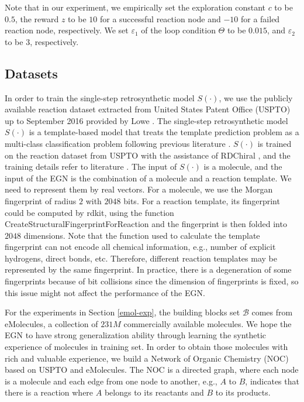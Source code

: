 \documentclass[sn-mathphys,Numbered]{sn-jnl}
\begin{document}
Note that in our experiment, we empirically set the exploration constant $c$ to be $0.5$, the reward $z$ to be $10$ for a successful reaction node and $-10$ for a failed reaction node, respectively. We set $\varepsilon_1$ of the loop condition $\Theta$ to be $0.015$, and $\varepsilon_2$ to be $3$, respectively.











\subsection{Datasets}\label{datasets}

In order to train the single-step retrosynthetic model $S(\cdot)$, we use the publicly available reaction dataset extracted from United States Patent Office (USPTO) up to September 2016 provided by Lowe \cite{lowe2017}. The single-step retrosynthetic model $S(\cdot)$ is a template-based model that treats the template prediction problem as a multi-class classification problem following previous literature \citep{Coley2017,Coley2017b}. $S(\cdot)$ is trained on the reaction dataset from USPTO with the assistance of RDChiral \citep{Coley2019}, and the training details  refer to literature \citep{retro2020,2022}.
The input of $S(\cdot)$ is a molecule, and the input of the EGN is the combination of a molecule and a reaction template. We need to represent them by real vectors. 
For a molecule, we use the Morgan fingerprint of radius $2$ with $2048$ bits. For a reaction template, its fingerprint could be computed by rdkit, using the function CreateStructuralFingerprintForReaction and the fingerprint is then folded into $2048$ dimensions.
Note that the function used to calculate the template fingerprint can not encode all chemical information, e.g., number of explicit hydrogens, direct bonds, etc.
Therefore, different reaction templates may be represented by the same fingerprint.
In practice, there is a degeneration of some fingerprints because of bit collisions since the dimension of fingerprints is fixed, so this issue might not affect the performance of the EGN.

For the experiments in Section \ref{emol-exp},
the building blocks set $\mathcal{B}$ comes from eMolecules, a collection of $231M$ commercially available molecules. We hope the EGN to have strong generalization ability through learning the synthetic experience of molecules in training set. In order to obtain those molecules with rich and valuable experience, we build a Network of Organic Chemistry (NOC) \citep{NOC1,NOC2,NOC3} based on USPTO and eMolecules. 
The NOC is a directed graph, where each node is a molecule and each edge from one node to another, e.g., $A$ to $B$, indicates that there is a reaction where $A$ belongs to its reactants and $B$ to its products. 
\end{document}

